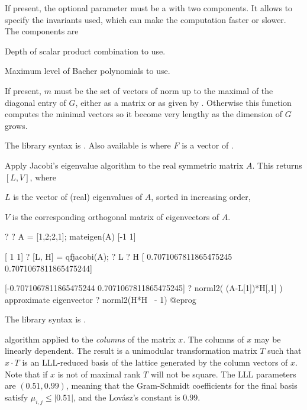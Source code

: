 If present, the optional parameter  must be a  with two
components. It allows to specify the invariants used, which can make the
computation faster or slower. The components are

\item {} Depth of scalar product combination to use.

\item {} Maximum level of Bacher polynomials to use.

If present, $m$ must be the set of vectors of norm up to the maximal of the
diagonal entry of $G$, either as a matrix or as given by .
Otherwise this function computes the minimal vectors so it become very
lengthy as the dimension of $G$ grows.

The library syntax is .
Also available is
where $F$ is a vector of .

\label{se:qfjacobi}
Apply Jacobi's eigenvalue algorithm to the real symmetric matrix $A$.
This returns $[L, V]$, where

\item $L$ is the vector of (real) eigenvalues of $A$, sorted in increasing
order,

\item $V$ is the corresponding orthogonal matrix of eigenvectors of $A$.

\bprog
? 
? A = [1,2;2,1]; mateigen(A)
[-1 1]

[ 1 1]
? [L, H] = qfjacobi(A);
? L
? H
[ 0.7071067811865475245 0.7071067811865475244]

[-0.7071067811865475244 0.7071067811865475245]
? norml2( (A-L[1])*H[,1] )       \\ approximate eigenvector
? norml2(H*H~ - 1)
@eprog

The library syntax is .

\label{se:qflll}
 algorithm applied to the
\emph{columns} of the matrix $x$. The columns of $x$ may be linearly
dependent. The result is a unimodular transformation matrix $T$ such that $x
\cdot T$ is an LLL-reduced basis of the lattice generated by the column
vectors of $x$. Note that if $x$ is not of maximal rank $T$ will not be
square. The LLL parameters are $(0.51,0.99)$, meaning that the Gram-Schmidt
coefficients for the final basis satisfy $\mu_{i,j} \leq |0.51|$, and the
Lov\'{a}sz's constant is $0.99$.

